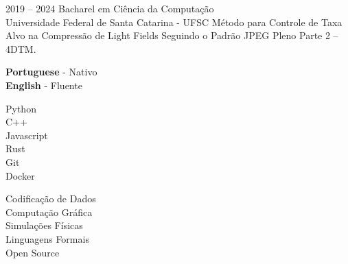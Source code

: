 \documentclass[11pt]{developercv} %
\begin{document}

\begin{entrylist}
	\entry
		{2019 -- 2024}
		{Bacharel em Ciência da Computação}
		{\\Universidade Federal de Santa Catarina - UFSC}
		{
			Método para Controle de Taxa Alvo na Compressão de Light Fields Seguindo o Padrão JPEG Pleno Parte 2 – 4DTM.
		}
\end{entrylist}


\begin{minipage}[t]{0.3\textwidth}
	\vspace{-\baselineskip} %
 
	\textbf{Portuguese} - Nativo \\
	\textbf{English} - Fluente
\end{minipage}
\hfill
\begin{minipage}[t]{0.3\textwidth}
	\vspace{-\baselineskip} %
 
    Python\\
    C++\\
    Javascript\\
	Rust\\
    Git\\
    Docker\\
    
    
\end{minipage}
\hfill
\begin{minipage}[t]{0.3\textwidth}
	\vspace{-\baselineskip} %
 
    Codificação de Dados\\
    Computação Gráfica\\
    Simulações Físicas\\
	Linguagens Formais\\
    Open Source
\end{minipage}

\end{document}
